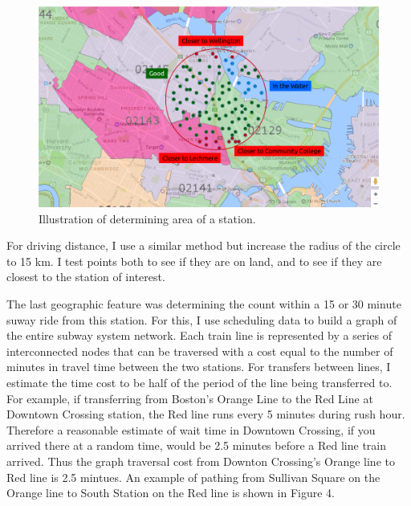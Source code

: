 \documentclass{article}
\begin{document}
\begin{figure}[H]\label{fig:f3}
\begin{center}\includegraphics[scale=0.6]{area_with_markup}\end{center}
\caption{Illustration of determining area of a station.}
\end{figure}

For driving distance, I use a similar method but increase the radius of the circle to 15 km. I test points both to see if they are on land, and to see if they are closest to the station of interest.

The last geographic feature was determining the count within a 15 or 30 minute suway ride from this station. For this, I use scheduling data to build a graph of the entire subway system network. Each train line is represented by a series of interconnected nodes that can be traversed with a cost equal to the number of minutes in travel time between the two stations. For transfers between lines, I estimate the time cost to be half of the period of the line being transferred to. For example, if transferring from Boston's Orange Line to the Red Line at Downtown Crossing station, the Red line runs every 5 minutes during rush hour. Therefore a reasonable estimate of wait time in Downtown Crossing, if you arrived there at a random time, would be 2.5 minutes before a Red line train arrived. Thus the graph traversal cost from Downton Crossing's Orange line to Red line is 2.5 mintues. An example of pathing from Sullivan Square on the Orange line to South Station on the Red line is shown in Figure 4. 
\end{document}
